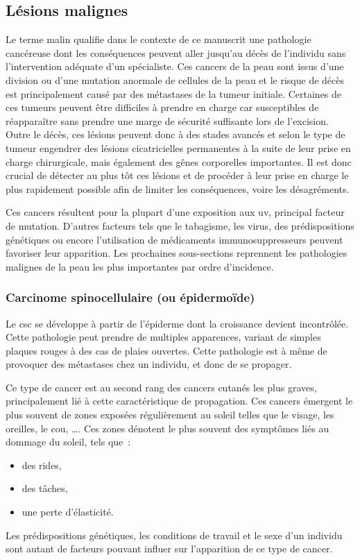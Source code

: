 \subsection{Lésions malignes}
Le terme malin qualifie dans le contexte de ce manuscrit une pathologie cancéreuse dont les conséquences peuvent aller jusqu'au décès de l'individu sans l'intervention adéquate d'un spécialiste. Ces cancers de la peau sont issus d’une division ou d’une mutation anormale de cellules de la peau et le risque de décès est principalement causé par des métastases de la tumeur initiale. Certaines de ces tumeurs peuvent être difficiles à prendre en charge car susceptibles de réapparaître sans prendre une marge de sécurité suffisante lors de l'excision. Outre le décès, ces lésions peuvent donc à des stades avancés et selon le type de tumeur engendrer des lésions cicatricielles permanentes à la suite de leur prise en charge chirurgicale, mais également des gênes corporelles importantes. Il est donc crucial de détecter au plus tôt ces lésions et de procéder à leur prise en charge le plus rapidement possible afin de limiter les conséquences, voire les désagréments.\par

Ces cancers résultent pour la plupart d’une exposition aux \gls{uv}, principal facteur de mutation. D’autres facteurs tels que le tabagisme, les virus, des prédispositions génétiques ou encore l’utilisation de médicaments immunosuppresseurs peuvent favoriser leur apparition. Les prochaines sous-sections reprennent les pathologies malignes de la peau les plus importantes par ordre d'incidence.\par

\subsubsection{Carcinome spinocellulaire (ou épidermoïde)}
Le \gls{csc} se développe à partir de l'épiderme dont la croissance devient incontrôlée. Cette pathologie peut prendre de multiples apparences, variant de simples plaques rouges à des cas de plaies ouvertes. Cette pathologie est à même de provoquer des métastases chez un individu, et donc de se propager.\par

Ce type de cancer est au second rang des cancers cutanés les plus graves, principalement lié à cette caractéristique de propagation. Ces cancers émergent le plus souvent de zones exposées régulièrement au soleil telles que le visage, les oreilles, le cou, \ldots. Ces zones dénotent le plus souvent des symptômes liés au dommage du soleil, tels que~:
\begin{itemize}
    \item des rides,
    \item des tâches,
    \item une perte d’élasticité.
\end{itemize}
Les prédispositions génétiques, les conditions de travail et le sexe d’un individu sont autant de facteurs pouvant influer sur l’apparition de ce type de cancer.\par

